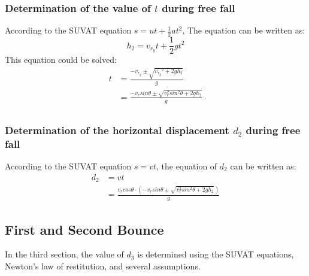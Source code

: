 \documentclass[conference]{IEEEtran}
\begin{document}
        \subsubsection{Determination of the value of $t$ during free fall}
            According to the SUVAT equation $s = ut +\frac{1}{2}at^2$, The equation can be written as:
            \begin{equation}
                h_2 = v_{r_y}t + \frac{1}{2}gt^2 \nonumber
            \end{equation}
            This equation could be solved:
            \begin{equation}
                \begin{aligned}
                    t &= \frac{-v_{r_y}\pm\sqrt{{v_{r_y}}^2+2gh_2}}{g}\\
                      &= \frac{-v_{r}sin\theta\pm\sqrt{{v^2_{r}sin^2\theta}+2gh_2}}{g}\\
                \end{aligned}
            \end{equation}
        \subsubsection{Determination of the horizontal displacement $d_2$ during free fall }
            According to the SUVAT equation $s = vt$, the equation of $d_2$ can be written as:
                \begin{equation}
                    \begin{aligned}
                        d_2 &= vt
                        \\ &= \frac{v_rcos\theta \cdot (-v_{r}sin\theta\pm\sqrt{{v^2_{r}sin^2\theta}+2gh_2})}{g}
                    \end{aligned}
                \end{equation}
    \subsection{First and Second Bounce}
        In the third section, the value of $d_3$ is determined using the SUVAT equations, Newton's law of restitution, and several assumptions.
\end{document}
